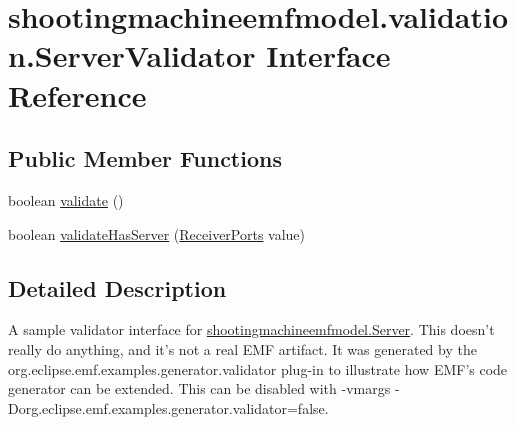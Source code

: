 \hypertarget{interfaceshootingmachineemfmodel_1_1validation_1_1_server_validator}{\section{shootingmachineemfmodel.\-validation.\-Server\-Validator Interface Reference}
\label{interfaceshootingmachineemfmodel_1_1validation_1_1_server_validator}
}
\subsection*{Public Member Functions}
\begin{DoxyCompactItemize}
\item 
boolean \hyperlink{interfaceshootingmachineemfmodel_1_1validation_1_1_server_validator_a68f7e72bb02eebc0547d3ae0c74db8a6}{validate} ()
\item 
boolean \hyperlink{interfaceshootingmachineemfmodel_1_1validation_1_1_server_validator_a0d24af3f3ca1576cc15b0610b6e01c17}{validate\-Has\-Server} (\hyperlink{interfaceshootingmachineemfmodel_1_1_receiver_ports}{Receiver\-Ports} value)
\end{DoxyCompactItemize}


\subsection{Detailed Description}
A sample validator interface for \hyperlink{interfaceshootingmachineemfmodel_1_1_server}{shootingmachineemfmodel.\-Server}. This doesn't really do anything, and it's not a real E\-M\-F artifact. It was generated by the org.\-eclipse.\-emf.\-examples.\-generator.\-validator plug-\/in to illustrate how E\-M\-F's code generator can be extended. This can be disabled with -\/vmargs -\/\-Dorg.\-eclipse.\-emf.\-examples.\-generator.\-validator=false. 

